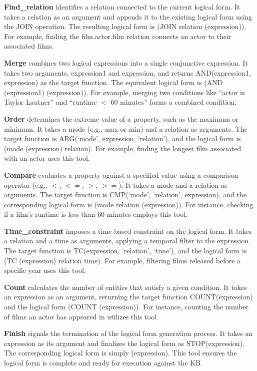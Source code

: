 \documentclass{article}
\theoremstyle{plain}
\theoremstyle{definition}
\theoremstyle{remark}
\begin{document}
\textbf{Find\_relation} identifies a relation connected to the current logical form. It takes a relation as an argument and appends it to the existing logical form using the JOIN operation. The resulting logical form is (JOIN relation (expression)). For example, finding the film.actor.film relation connects an actor to their associated films.

\textbf{Merge} combines two logical expressions into a single conjunctive expression. It takes two arguments, expression1 and expression, and returns AND(expression1, expression) as the target function. The equivalent logical form is (AND (expression1) (expression)). For example, merging two conditions like ``actor is Taylor Lautner” and ``runtime $<$ 60 minutes” forms a combined condition.

\textbf{Order} determines the extreme value of a property, such as the maximum or minimum. It takes a mode (e.g., max or min) and a relation as arguments. The target function is ARG(`mode', expression, `relation'), and the logical form is (mode (expression) relation). For example, finding the longest film associated with an actor uses this tool.

\textbf{Compare} evaluates a property against a specified value using a comparison operator (e.g., $<$, $<=$, $>$, $>=$). It takes a mode and a relation as arguments. The target function is CMP(`mode', `relation', expression), and the corresponding logical form is (mode relation (expression)). For instance, checking if a film’s runtime is less than 60 minutes employs this tool.

\textbf{Time\_constraint} imposes a time-based constraint on the logical form. It takes a relation and a time as arguments, applying a temporal filter to the expression. The target function is TC(expression, `relation', `time'), and the logical form is (TC (expression) relation time). For example, filtering films released before a specific year uses this tool.

\textbf{Count} calculates the number of entities that satisfy a given condition. It takes an expression as an argument, returning the target function COUNT(expression) and the logical form (COUNT (expression)). For instance, counting the number of films an actor has appeared in utilizes this tool.

\textbf{Finish} signals the termination of the logical form generation process. It takes an expression as its argument and finalizes the logical form as STOP(expression). The corresponding logical form is simply (expression). This tool ensures the logical form is complete and ready for execution against the KB.
\end{document}
